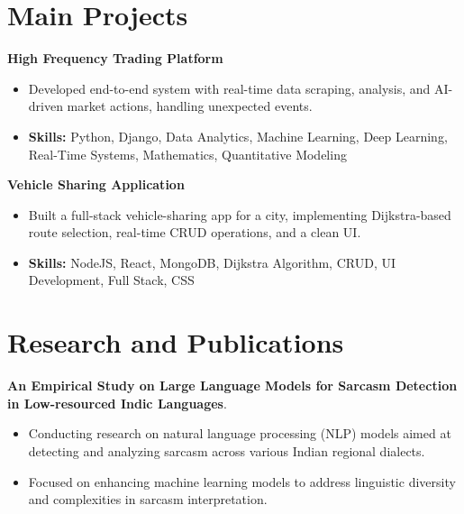 \documentclass[a4paper,11pt]{article}
\begin{document}
\section{\textbf{Main Projects}}

\vspace{1mm}
  \textbf{High Frequency Trading Platform  }
\vspace{-1.5mm} %
\begin{itemize}
  \item Developed end-to-end system with real-time data scraping, analysis, and AI-driven market actions, handling unexpected events.
\vspace{-3mm}
  \item \textbf{Skills:} Python, Django, Data Analytics, Machine Learning, Deep Learning, Real-Time Systems, Mathematics, Quantitative Modeling
\end{itemize}


\vspace{1mm}
   \textbf{Vehicle Sharing Application }
\vspace{-1.5mm} %
\begin{itemize}
  \item Built a full-stack vehicle-sharing app for a city, implementing Dijkstra-based route selection, real-time CRUD operations, and a clean UI.
\vspace{-3mm}
  \item \textbf{Skills:} NodeJS, React, MongoDB, Dijkstra Algorithm, CRUD, UI Development, Full Stack, CSS
\end{itemize}



\section{\textbf{Research and Publications} \hfill }
\vspace{1mm}
  \textbf{An Empirical Study on Large Language Models for Sarcasm Detection in Low-resourced Indic Languages}.
\vspace{-1mm} %
\begin{itemize}
  \item Conducting research on natural language processing (NLP) models aimed at detecting and analyzing sarcasm across various Indian regional dialects.
\vspace{-3mm}
  \item Focused on enhancing machine learning models to address linguistic diversity and complexities in sarcasm interpretation.
\end{itemize}
\end{document}
